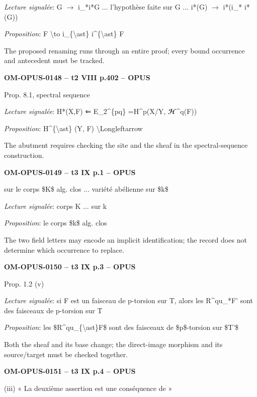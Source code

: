 \emph{Lecture signalée}: G \ensuremath{\to} i\_*i*G ... l'hypothèse faite sur G ... i*(G) \ensuremath{\to} i*(i\_* i*(G))\par
\emph{Proposition}: F \textbackslash{}to i\_\{\textbackslash{}ast\} i\textasciicircum{}\{\textbackslash{}ast\} F\par
The proposed renaming runs through an entire proof; every bound occurrence and antecedent must be tracked.\par
\par\noindent\textbf{OM-OPUS-0148 -- t2 VIII p.402 -- OPUS}\par
Prop. 8.1, spectral sequence\par
\emph{Lecture signalée}: H*(X,F) ⇐ E\_2\textasciicircum{}\{pq\} =\allowbreak  H\textasciicircum{}p(X/Y, \ensuremath{𝓗}\textasciicircum{}q(F))\par
\emph{Proposition}: H\textasciicircum{}\{\textbackslash{}ast\} (Y, F) \textbackslash{}Longleftarrow\par
The abutment requires checking the site and the sheaf in the spectral-sequence construction.\par
\par\noindent\textbf{OM-OPUS-0149 -- t3 IX p.1 -- OPUS}\par
sur le corps \$K\$ alg. clos ... variété abélienne sur \$k\$\par
\emph{Lecture signalée}: corps K ... sur k\par
\emph{Proposition}: le corps \$k\$ alg. clos\par
The two field letters may encode an implicit identification; the record does not determine which occurrence to replace.\par
\par\noindent\textbf{OM-OPUS-0150 -- t3 IX p.3 -- OPUS}\par
Prop. 1.2 (v)\par
\emph{Lecture signalée}: si F est un faisceau de p-torsion sur T, alors les R\textasciicircum{}qu\_*F' sont des faisceaux de p-torsion sur T\par
\emph{Proposition}: les \$R\textasciicircum{}qu\_\{\textbackslash{}ast\}F\$ sont des faisceaux de \$p\$-torsion sur \$T'\$\par
Both the sheaf and its base change; the direct-image morphism and its source/target must be checked together.\par
\par\noindent\textbf{OM-OPUS-0151 -- t3 IX p.4 -- OPUS}\par
(iii) « La deuxième assertion est une conséquence de »\par
